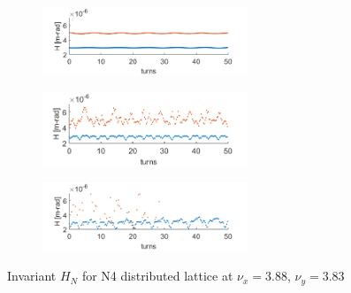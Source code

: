 \begin{figure}[!htb]
   \centering
	\begin{subfigure}[]{0.5\textwidth} \centering
    \includegraphics*[width=174pt]{6.figures/Ioct=0_F0870_D0870}
	\end{subfigure}
	\begin{subfigure}[]{0.5\textwidth} \centering
    \includegraphics*[width=174pt]{6.figures/Ioct=2_F0870_D0870}
	\end{subfigure}
	\begin{subfigure}[]{0.5\textwidth} \centering
    \includegraphics*[width=174pt]{6.figures/Ioct=4_F0870_D0870}
	\end{subfigure}
 	\caption{Invariant $H_N$ for N4 distributed lattice at $\nu_x=3.88$, $\nu_y=3.83$}
   \label{N4invar1}
\end{figure}


